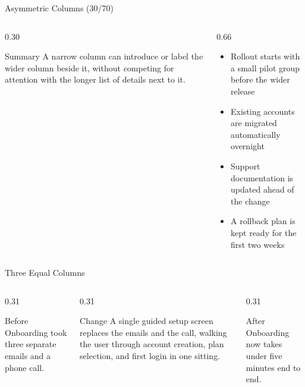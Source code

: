 \documentclass[aspectratio=169]{beamer}
\begin{document}
\begin{frame}{Asymmetric Columns (30/70)}
  \begin{columns}[T]
    \begin{column}{0.30\textwidth}
      \begin{block}{Summary}
        {\small A narrow column can introduce or label the wider column
        beside it, without competing for attention with the longer
        list of details next to it.}
      \end{block}
    \end{column}
    \begin{column}{0.66\textwidth}
      \begin{itemize}
        \item Rollout starts with a small pilot group before the
          wider release
        \item Existing accounts are migrated automatically overnight
        \item Support documentation is updated ahead of the change
        \item A rollback plan is kept ready for the first two weeks
      \end{itemize}
    \end{column}
  \end{columns}
\end{frame}

\begin{frame}{Three Equal Columns}
  \begin{columns}[T]
    \begin{column}{0.31\textwidth}
      \begin{block}{Before}
        {\small Onboarding took three separate emails and a phone
        call.}
      \end{block}
    \end{column}
    \begin{column}{0.31\textwidth}
      \begin{block}{Change}
        {\small A single guided setup screen replaces the emails and
        the call, walking the user through account creation, plan
        selection, and first login in one sitting.}
      \end{block}
    \end{column}
    \begin{column}{0.31\textwidth}
      \begin{block}{After}
        {\small Onboarding now takes under five minutes end to end.}
      \end{block}
    \end{column}
  \end{columns}
\end{frame}
\end{document}
